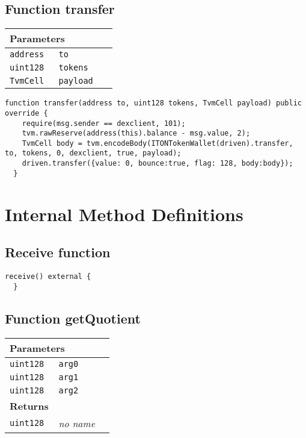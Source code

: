 \subsection{Function transfer}


\ifsoltables
\noindent\begin{tabular}{|l|l|p{5cm}|}\hline
\multicolumn{3}{|l|}{\bf Parameters}\\\hline
\tt address & \tt to &\\\hline
\tt uint128 & \tt tokens &\\\hline
\tt TvmCell & \tt payload &\\\hline
\end{tabular}
\fi

\vspace{2cm}

\begin{lstlisting}[firstnumber=108]
  function transfer(address to, uint128 tokens, TvmCell payload) public override {
    require(msg.sender == dexclient, 101);
    tvm.rawReserve(address(this).balance - msg.value, 2);
    TvmCell body = tvm.encodeBody(ITONTokenWallet(driven).transfer, to, tokens, 0, dexclient, true, payload);
    driven.transfer({value: 0, bounce:true, flag: 128, body:body});
  }
\end{lstlisting}

\section{Internal Method Definitions}


\subsection{Receive function}

\vspace{2cm}

\begin{lstlisting}[firstnumber=129]
  receive() external {
  }
\end{lstlisting}

\subsection{Function getQuotient}


\ifsoltables
\noindent\begin{tabular}{|l|l|p{5cm}|}\hline
\multicolumn{3}{|l|}{\bf Parameters}\\\hline
\tt uint128 & \tt arg0 &\\\hline
\tt uint128 & \tt arg1 &\\\hline
\tt uint128 & \tt arg2 &\\\hline
\multicolumn{3}{|l|}{\bf Returns}\\\hline
\tt uint128 & {\em no name} &\\\hline
\end{tabular}
\fi

